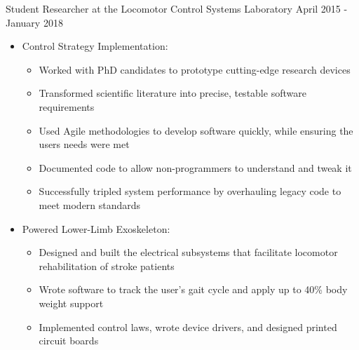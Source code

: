 Student Researcher at the Locomotor Control Systems Laboratory
\hfill
April 2015 - January 2018
\begin{itemize}
    \item Control Strategy Implementation:
    \begin{itemize}
        \item Worked with PhD candidates to prototype cutting-edge research devices
        \item Transformed scientific literature into precise, testable software requirements
        \item Used Agile methodologies to develop software quickly, while ensuring the user\textsc{}s needs were met
        \item Documented code to allow non-programmers to understand and tweak it
        \item Successfully tripled system performance by overhauling legacy code to meet modern standards
    \end{itemize}
    \item Powered Lower-Limb Exoskeleton:
    \begin{itemize}
        \item Designed and built the electrical subsystems that facilitate locomotor rehabilitation of stroke patients %
        \item Wrote software to track the user’s gait cycle and apply up to 40\% body weight support
        \item Implemented control laws, wrote device drivers, and designed printed circuit boards
    \end{itemize}
\end{itemize}
